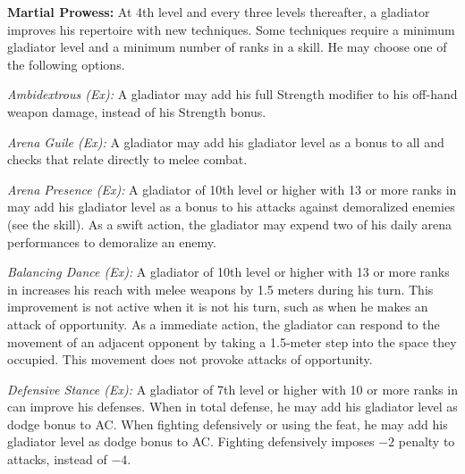 \textbf{Martial Prowess:} At 4th level and every three levels thereafter, a gladiator improves his repertoire with new techniques. Some techniques require a minimum gladiator level and a minimum number of ranks in a skill. He may choose one of the following options.

 

\textit{Ambidextrous (Ex):} A gladiator may add his full Strength modifier to his off-hand weapon damage, instead of \onehalf his Strength bonus.

\textit{Arena Guile (Ex):} A gladiator may add \onehalf his gladiator level as a bonus to all  and  checks that relate directly to melee combat.

\textit{Arena Presence (Ex):} A gladiator of 10th level or higher with 13 or more ranks in  may add \onequarter his gladiator level as a bonus to his attacks against demoralized enemies (see the  skill). As a swift action, the gladiator may expend two of his daily arena performances to demoralize an enemy.

\textit{Balancing Dance (Ex):} A gladiator of 10th level or higher with 13 or more ranks in  increases his reach with melee weapons by 1.5 meters during his turn. This improvement is not active when it is not his turn, such as when he makes an attack of opportunity. As a immediate action, the gladiator can respond to the movement of an adjacent opponent by taking a 1.5-meter step into the space they occupied. This movement does not provoke attacks of opportunity.

\textit{Defensive Stance (Ex):} A gladiator of 7th level or higher with 10 or more ranks in  can improve his defenses. When in total defense, he may add \onehalf his gladiator level as dodge bonus to AC. When fighting defensively or using the  feat, he may add \onequarter his gladiator level as dodge bonus to AC. Fighting defensively imposes $-2$ penalty to attacks, instead of $-4$.


